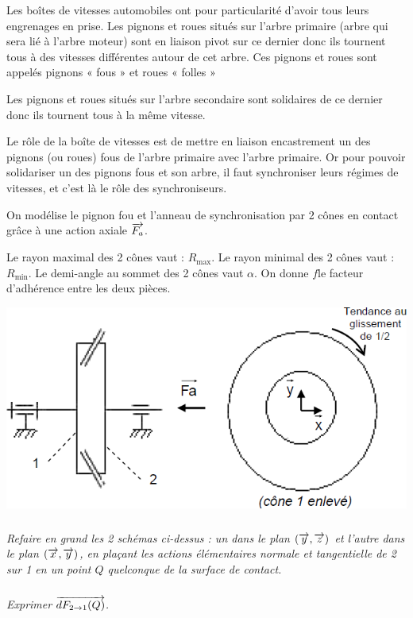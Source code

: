 \documentclass[10pt,fleqn]{article} %
\begin{document}
\begin{multicols}{2}
Les boîtes de vitesses automobiles ont pour particularité d'avoir tous leurs engrenages en prise. 
Les pignons et roues situés sur l’arbre primaire (arbre qui sera lié à l'arbre moteur) sont en liaison pivot sur ce dernier donc ils tournent tous à des vitesses différentes autour de cet arbre. Ces pignons et roues sont 
appelés pignons « fous » et roues « folles » 

Les pignons et roues situés sur l’arbre secondaire sont solidaires de ce dernier donc ils tournent tous à la même vitesse. 

Le rôle de la boîte de vitesses est de mettre en liaison encastrement un des pignons (ou roues) fous de l’arbre primaire avec l’arbre primaire. Or pour pouvoir solidariser un des pignons fous et son arbre, il faut synchroniser leurs régimes de vitesses, et c'est là le rôle des synchroniseurs. 


On modélise le pignon fou et l'anneau de synchronisation par 2 cônes en contact 
grâce à une action axiale $\overrightarrow{F_a}$. 
 
Le rayon maximal des 2 cônes vaut : $R_{\text{max}}$. 
Le rayon minimal des 2 cônes vaut : $R_{\text{min}}$. 
Le demi-angle au sommet des 2 cônes vaut $\alpha$. 
On donne $f$le facteur d’adhérence 
entre les deux pièces.



\begin{center}
\includegraphics[width=\linewidth]{images/fig_09}
\end{center}


\subparagraph{}
\textit{Refaire en grand les 2 schémas ci-dessus : un dans le plan $(\overrightarrow{y}, \overrightarrow{z})$ et l’autre dans le plan $(\overrightarrow{x}, \overrightarrow{y})$, en plaçant les actions élémentaires normale et tangentielle de 2 sur 1 en un point $Q$ quelconque de la surface de contact.}

\subparagraph{}
\textit{Exprimer $\overrightarrow{dF_{2\rightarrow 1}(Q)}$.}


\end{multicols}
\end{document}
